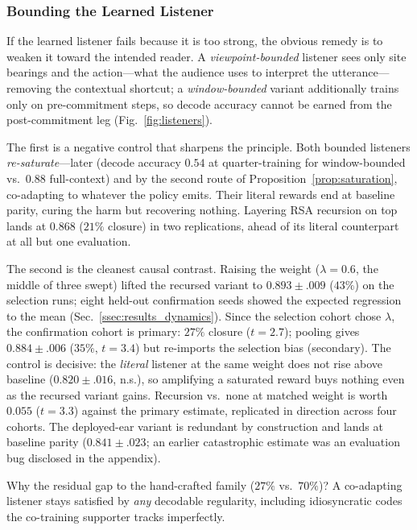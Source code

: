 \documentclass[sigconf,review,anonymous]{acmart}
\begin{document}
\subsubsection{Bounding the Learned Listener}
\label{ssec:results_bounded}

If the learned listener fails because it is too strong, the obvious remedy is to weaken it toward the intended reader. A \emph{viewpoint-bounded} listener sees only site bearings and the action---what the audience uses to interpret the utterance---removing the contextual shortcut; a \emph{window-bounded} variant additionally trains only on pre-commitment steps, so decode accuracy cannot be earned from the post-commitment leg (Fig.~\ref{fig:listeners}).

The first is a negative control that sharpens the principle. Both bounded listeners \emph{re-saturate}---later (decode accuracy $0.54$ at quarter-training for window-bounded vs.\ $0.88$ full-context) and by the second route of Proposition~\ref{prop:saturation}, co-adapting to whatever the policy emits. Their literal rewards end at baseline parity, curing the harm but recovering nothing. Layering RSA recursion on top lands at $0.868$ ($21\%$ closure) in two replications, ahead of its literal counterpart at all but one evaluation.

The second is the cleanest causal contrast. Raising the weight ($\lambda{=}0.6$, the middle of three swept) lifted the recursed variant to $0.893\pm.009$ ($43\%$) on the selection runs; eight held-out confirmation seeds showed the expected regression to the mean (Sec.~\ref{ssec:results_dynamics}). Since the selection cohort chose $\lambda$, the confirmation cohort is primary: $27\%$ closure ($t=2.7$); pooling gives $0.884\pm.006$ ($35\%$, $t=3.4$) but re-imports the selection bias (secondary). The control is decisive: the \emph{literal} listener at the same weight does not rise above baseline ($0.820\pm.016$, n.s.), so amplifying a saturated reward buys nothing even as the recursed variant gains. Recursion vs.\ none at matched weight is worth $0.055$ ($t{=}3.3$) against the primary estimate, replicated in direction across four cohorts. The deployed-ear variant is redundant by construction and lands at baseline parity ($0.841\pm.023$; an earlier catastrophic estimate was an evaluation bug disclosed in the appendix).

Why the residual gap to the hand-crafted family ($27\%$ vs.\ $70\%$)? A co-adapting listener stays satisfied by \emph{any} decodable regularity, including idiosyncratic codes the co-training supporter tracks imperfectly.
\end{document}
